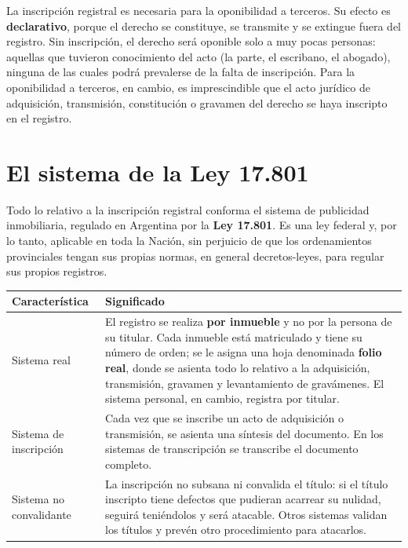 \documentclass[12pt,oneside]{book}
\begin{document}
La inscripción registral es necesaria para la oponibilidad a terceros. Su efecto es \textbf{declarativo}, porque el derecho se constituye, se transmite y se extingue fuera del registro. Sin inscripción, el derecho será oponible solo a muy pocas personas: aquellas que tuvieron conocimiento del acto (la parte, el escribano, el abogado), ninguna de las cuales podrá prevalerse de la falta de inscripción. Para la oponibilidad a terceros, en cambio, es imprescindible que el acto jurídico de adquisición, transmisión, constitución o gravamen del derecho se haya inscripto en el registro.

\section{El sistema de la Ley 17.801}

Todo lo relativo a la inscripción registral conforma el sistema de publicidad inmobiliaria, regulado en Argentina por la \textbf{Ley 17.801}. Es una ley federal y, por lo tanto, aplicable en toda la Nación, sin perjuicio de que los ordenamientos provinciales tengan sus propias normas, en general decretos-leyes, para regular sus propios registros.

\begin{table}[H]
\centering
\begin{tabularx}{\textwidth}{@{}>{\raggedright\arraybackslash}p{}>{\raggedright\arraybackslash}X@{}}
\toprule
\textbf{Característica} & \textbf{Significado} \\
\midrule
Sistema real & El registro se realiza \textbf{por inmueble} y no por la persona de su titular. Cada inmueble está matriculado y tiene su número de orden; se le asigna una hoja denominada \textbf{folio real}, donde se asienta todo lo relativo a la adquisición, transmisión, gravamen y levantamiento de gravámenes. El sistema personal, en cambio, registra por titular. \\
Sistema de inscripción & Cada vez que se inscribe un acto de adquisición o transmisión, se asienta una síntesis del documento. En los sistemas de transcripción se transcribe el documento completo. \\
Sistema no convalidante & La inscripción no subsana ni convalida el título: si el título inscripto tiene defectos que pudieran acarrear su nulidad, seguirá teniéndolos y será atacable. Otros sistemas validan los títulos y prevén otro procedimiento para atacarlos. \\
\bottomrule
\end{tabularx}
\end{table}
\end{document}
